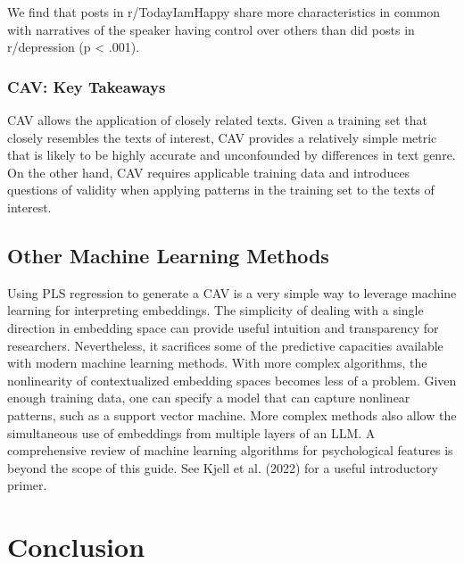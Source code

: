 \documentclass[
  man,
  floatsintext,
  longtable,
  nolmodern,
  notxfonts,
  notimes,
  colorlinks=true,linkcolor=blue,citecolor=blue,urlcolor=blue]{apa7}
\begin{document}
We find that posts in r/TodayIamHappy share more characteristics in
common with narratives of the speaker having control over others than
did posts in r/depression (p \textless{} .001).

\subsubsection{CAV: Key Takeaways}\label{cav-key-takeaways}

CAV allows the application of closely related texts. Given a training
set that closely resembles the texts of interest, CAV provides a
relatively simple metric that is likely to be highly accurate and
unconfounded by differences in text genre. On the other hand, CAV
requires applicable training data and introduces questions of validity
when applying patterns in the training set to the texts of interest.

\subsection{Other Machine Learning
Methods}\label{other-machine-learning-methods}

Using PLS regression to generate a CAV is a very simple way to leverage
machine learning for interpreting embeddings. The simplicity of dealing
with a single direction in embedding space can provide useful intuition
and transparency for researchers. Nevertheless, it sacrifices some of
the predictive capacities available with modern machine learning
methods. With more complex algorithms, the nonlinearity of
contextualized embedding spaces becomes less of a problem. Given enough
training data, one can specify a model that can capture nonlinear
patterns, such as a support vector machine. More complex methods also
allow the simultaneous use of embeddings from multiple layers of an LLM.
A comprehensive review of machine learning algorithms for psychological
features is beyond the scope of this guide. See Kjell et al. (2022) for
a useful introductory primer.

\section{Conclusion}\label{conclusion}
\end{document}
